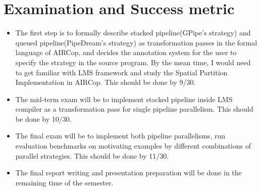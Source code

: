 \documentclass[sigplan,nonacm]{acmart}
\begin{document}
\section{Examination and Success metric}
\begin{itemize}
  \item The first step is to formally describe stacked pipeline(GPipe's strategy) and queued pipeline(PipeDream's strategy) as transformation passes in the formal language of AIRCop, and decides the annotation system for the user to specify the strategy in the source program. By the mean time, I would need to get familiar with LMS framework and study the Spatial Partition Implementation in AIRCop. This should be done by 9/30. 
  \item The mid-term exam will be to implement stacked pipeline inside LMS compiler as a transformation pass for single pipeline parallelism. This should be done by 10/30.
  \item The final exam will be to implement both pipeline parallelisms, run evaluation benchmarks on motivating examples by different combinations of parallel strategies. This should be done by 11/30.
  \item The final report writing and presentation preparation will be done in the remaining time of the semester. 
\end{itemize}
\end{document}
